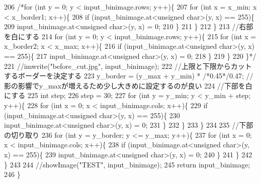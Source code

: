 \begin{DoxyCode}
206     \textcolor{comment}{/*for (int y = 0; y < input\_binimage.rows; y++)\{}
207 \textcolor{comment}{        for (int x = x\_min; x < x\_border1; x++)\{}
208 \textcolor{comment}{            if (input\_binimage.at<unsigned char>(y, x) == 255)\{}
209 \textcolor{comment}{                input\_binimage.at<unsigned char>(y, x) = 0;}
210 \textcolor{comment}{            \}}
211 \textcolor{comment}{        \}}
212 \textcolor{comment}{    \}}
213 \textcolor{comment}{    //右部を白にする}
214 \textcolor{comment}{    for (int y = 0; y < input\_binimage.rows; y++)\{}
215 \textcolor{comment}{        for (int x = x\_border2; x < x\_max; x++)\{}
216 \textcolor{comment}{            if (input\_binimage.at<unsigned char>(y, x) == 255)\{}
217 \textcolor{comment}{                input\_binimage.at<unsigned char>(y, x) = 0;}
218 \textcolor{comment}{            \}}
219 \textcolor{comment}{        \}}
220 \textcolor{comment}{    \}*/}
221     \textcolor{comment}{//imwrite("before\_cut.jpg", input\_binimage);}
222     \textcolor{comment}{//上限と下限からカットするボーダーを決定する}
223     y\_border = (y\_max + y\_min) * \textcolor{comment}{/*0.45*/}0.47; \textcolor{comment}{//影の影響でy\_maxが増えるため少し大きめに設定するのが良い }
224     \textcolor{comment}{//下部を白にする}
225     \textcolor{keywordtype}{int} step;
226     step = 30;
227     \textcolor{keywordflow}{for} (\textcolor{keywordtype}{int} y = y\_min; y < y\_min + step; y++)\{
228         \textcolor{keywordflow}{for} (\textcolor{keywordtype}{int} x = 0; x < input\_binimage.cols; x++)\{
229             \textcolor{keywordflow}{if} (input\_binimage.at<\textcolor{keywordtype}{unsigned} \textcolor{keywordtype}{char}>(y, x) == 255)\{
230                 input\_binimage.at<\textcolor{keywordtype}{unsigned} \textcolor{keywordtype}{char}>(y, x) = 0;
231             \}
232         \}
233     \}
234 
235     \textcolor{comment}{//下部の切り取り}
236     \textcolor{keywordflow}{for} (\textcolor{keywordtype}{int} y = y\_border; y <= y\_max; y++)\{
237         \textcolor{keywordflow}{for} (\textcolor{keywordtype}{int} x = 0; x < input\_binimage.cols; x++)\{
238             \textcolor{keywordflow}{if} (input\_binimage.at<\textcolor{keywordtype}{unsigned} \textcolor{keywordtype}{char}>(y, x) == 255)\{
239                 input\_binimage.at<\textcolor{keywordtype}{unsigned} \textcolor{keywordtype}{char}>(y, x) = 0;
240             \}
241         \}
242     \}
243 
244     \textcolor{comment}{//showImage("TEST", input\_binimage);}
245     \textcolor{keywordflow}{return} input\_binimage;
246 \}
\end{DoxyCode}
